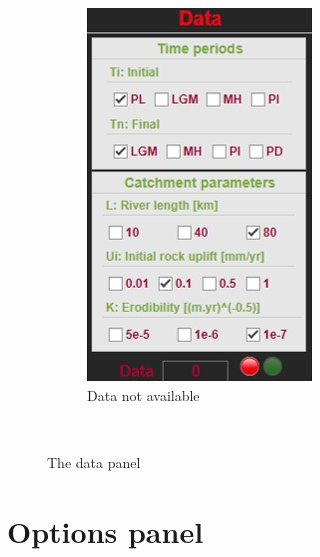 \documentclass[11pt,a4paper,titlepage]{report}
\begin{document}
\begin{figure}[H]
\begin{subfigure}[H]{0.2\textwidth}
        \includegraphics[width=\textwidth]{data4.jpg}
        \caption{Data not available}
    \end{subfigure}\\
    \caption[The data panel]{The data panel}
    \label{fig:datapanel}    
\end{figure}

\section{Options panel}
\end{document}
